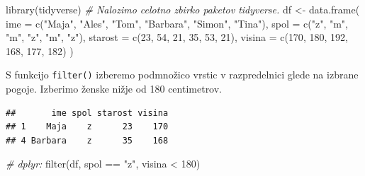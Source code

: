 \documentclass[
]{book}
\newenvironment{Shaded}{\begin{snugshade}}{\end{snugshade}}
\newcommand{\AttributeTok}[1]{\textcolor[rgb]{0.77,0.63,0.00}{#1}}
\newcommand{\CommentTok}[1]{\textcolor[rgb]{0.56,0.35,0.01}{\textit{#1}}}
\newcommand{\DecValTok}[1]{\textcolor[rgb]{0.00,0.00,0.81}{#1}}
\newcommand{\FunctionTok}[1]{\textcolor[rgb]{0.00,0.00,0.00}{#1}}
\newcommand{\NormalTok}[1]{#1}
\newcommand{\OtherTok}[1]{\textcolor[rgb]{0.56,0.35,0.01}{#1}}
\newcommand{\SpecialCharTok}[1]{\textcolor[rgb]{0.00,0.00,0.00}{#1}}
\newcommand{\StringTok}[1]{\textcolor[rgb]{0.31,0.60,0.02}{#1}}
\begin{document}
\begin{Shaded}
\begin{Highlighting}[]
\FunctionTok{library}\NormalTok{(tidyverse)  }\CommentTok{\# Nalozimo celotno zbirko paketov tidyverse.}
\NormalTok{df }\OtherTok{\textless{}{-}} \FunctionTok{data.frame}\NormalTok{(}
  \AttributeTok{ime =} \FunctionTok{c}\NormalTok{(}\StringTok{"Maja"}\NormalTok{, }\StringTok{"Ales"}\NormalTok{, }\StringTok{"Tom"}\NormalTok{, }\StringTok{"Barbara"}\NormalTok{, }\StringTok{"Simon"}\NormalTok{, }\StringTok{"Tina"}\NormalTok{),}
  \AttributeTok{spol =} \FunctionTok{c}\NormalTok{(}\StringTok{"z"}\NormalTok{, }\StringTok{"m"}\NormalTok{, }\StringTok{"m"}\NormalTok{, }\StringTok{"z"}\NormalTok{, }\StringTok{"m"}\NormalTok{, }\StringTok{"z"}\NormalTok{),}
  \AttributeTok{starost =} \FunctionTok{c}\NormalTok{(}\DecValTok{23}\NormalTok{, }\DecValTok{54}\NormalTok{, }\DecValTok{21}\NormalTok{, }\DecValTok{35}\NormalTok{, }\DecValTok{53}\NormalTok{, }\DecValTok{21}\NormalTok{),}
  \AttributeTok{visina =} \FunctionTok{c}\NormalTok{(}\DecValTok{170}\NormalTok{, }\DecValTok{180}\NormalTok{, }\DecValTok{192}\NormalTok{, }\DecValTok{168}\NormalTok{, }\DecValTok{177}\NormalTok{, }\DecValTok{182}\NormalTok{)}
\NormalTok{)}
\end{Highlighting}
\end{Shaded}

S funkcijo \texttt{filter()} izberemo podmnožico vrstic v razpredelnici glede na izbrane pogoje. Izberimo ženske nižje od 180 centimetrov.

\begin{Shaded}
\end{Shaded}

\begin{verbatim}
##       ime spol starost visina
## 1    Maja    z      23    170
## 4 Barbara    z      35    168
\end{verbatim}

\begin{Shaded}
\begin{Highlighting}[]
\CommentTok{\# dplyr:}
\FunctionTok{filter}\NormalTok{(df, spol }\SpecialCharTok{==} \StringTok{"z"}\NormalTok{, visina }\SpecialCharTok{\textless{}} \DecValTok{180}\NormalTok{)}
\end{Highlighting}
\end{Shaded}
\end{document}
